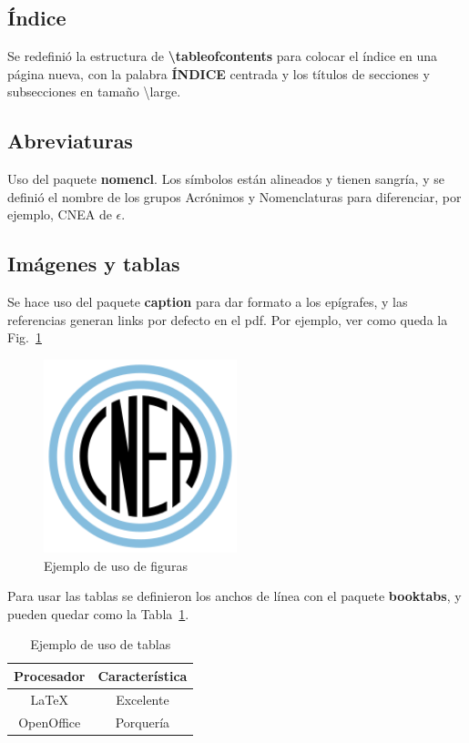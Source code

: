 \documentclass[a4paper,11pt,twoside]{MECOM}
\begin{document}
    \subsection{\'Indice}
        Se redefini\'o la estructura de {\bf \textbackslash tableofcontents} para colocar el \'indice en una p\'agina nueva, con la palabra {\bf \'INDICE} centrada y los t\'itulos de secciones y subsecciones en tama\~no \textbackslash large.
        
        
    \subsection{Abreviaturas}
        Uso del paquete {\bf nomencl}. Los s\'imbolos est\'an alineados y tienen sangr\'ia, y se defini\'o el nombre de los grupos Acr\'onimos y Nomenclaturas para diferenciar, por ejemplo, CNEA de $\epsilon$.
        
    \subsection{Im\'agenes y tablas}
    Se hace uso del paquete {\bf caption} para dar formato a los ep\'igrafes, y las referencias generan links por defecto en el pdf. Por ejemplo, ver como queda la Fig.~\ref{fg:Logo_CNEA}
    \begin{figure}[ht]
        \centering
        \includegraphics[width=0.5\textwidth]{Logo_CNEA}
        \caption{Ejemplo de uso de figuras}
        \label{fg:Logo_CNEA}
    \end{figure}    
    
    \par
    Para usar las tablas se definieron los anchos de l\'inea con el paquete {\bf booktabs}, y pueden quedar como la Tabla~\ref{tab:prueba}.
    \begin{table}[ht]
        \centering
        \begin{tabular}{c c}
            \toprule
            \bf Procesador & \bf Caracter\'istica \\
            \midrule
            \LaTeX{} & Excelente \\
            OpenOffice & Porquer\'ia\\
            \bottomrule
        \end{tabular}
        \caption{Ejemplo de uso de tablas}
        \label{tab:prueba}
    \end{table}    
    
\end{document}
